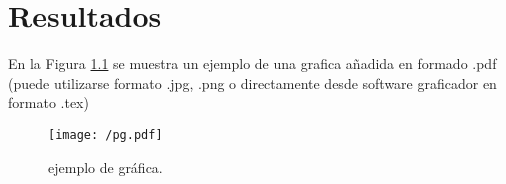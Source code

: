 \chapter{Resultados}\label{cap4} %
\graphicspath{{./graficas}}
\linespread{1.3}
En la Figura \ref{fig:graf} se muestra un ejemplo de una grafica añadida en formado .pdf (puede utilizarse formato .jpg, .png o directamente desde software graficador en formato .tex)
\begin{figure}[hbtp]
\centering
\texttt{[image: /pg.pdf]}
\caption{ejemplo de gráfica.}
\label{fig:graf}
\end{figure}
\clearpage%